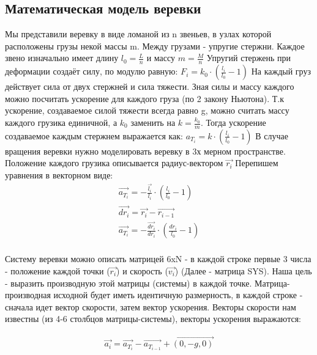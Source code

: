 \documentclass[a4paper,12pt]{article}
\begin{document}
\subsection{Математическая модель веревки}
Мы представили веревку в виде ломаной из n звеньев, в узлах которой расположены грузы некой массы m. Между грузами - упругие стержни. 
Каждое звено изначально имеет длину $l_0 = \frac{L}{n}$ и массу $m = \frac{M}{n}$
Упругий стержень при деформации создаёт силу, по модулю равную: $F_i = k_0 \cdot (\frac{l_i}{l_0} - 1)$
На каждый груз действует сила от двух стержней и сила тяжести. Зная силы и массу каждого можно посчитать ускорение для каждого груза (по 2 закону Ньютона). 
Т.к ускорение, создаваемое силой тяжести всегда равно g, можно считать массу каждого грузика единичной, а $k_0$ заменить на $k = \frac{k_0}{m}$. Тогда ускорение создаваемое каждым стержнем выражается как:
$a_{T_i} = k \cdot (\frac{l_i}{l_0} - 1)$
В случае вращения веревки нужно моделировать веревку в 3х мерном пространстве.
Положение каждого грузика описывается радиус-вектором $\vec{r_i}$
Перепишем уравнения в векторном виде:
\begin{equation}
    \begin{aligned}
	\vec{a_{T_i}} = -\frac{\vec{l_i}}{l_i} \cdot ( \frac{l_i}{l_0}-1) \\
	\vec{dr_i} = \vec{r_i} - \vec{r_{i-1}}\\
	\vec{a_{T_i}} = -\frac{\vec{dr_i}}{dr_i} \cdot ( \frac{dr_i}{l_0}-1)\\
    \end{aligned}
\end{equation}

Систему веревки можно описать матрицей 6xN - в каждой строке первые 3 числа - положение каждой точки ($\vec{r_i}$) и скорость ($\vec{v_i}$) (Далее - матрица SYS).
Наша цель - выразить производную этой матрицы (системы) в каждой точке. Матрица-производная исходной будет иметь идентичную размерность, в каждой строке - сначала идет вектор скорости, затем вектор ускорения. Векторы скорости нам известны (из 4-6 столбцов матрицы-системы), векторы ускорения выражаются: 

\begin{equation}
    \begin{aligned}
	\vec{a_i} =\overrightarrow{a_{T_i}} - \overrightarrow{a_{T_{i-1}}} + \overrightarrow{(0, -g ,0)}\\
    \end{aligned}
\end{equation}
\end{document}
